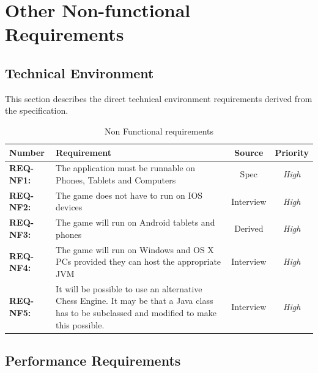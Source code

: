 \documentclass[a4paper,10pt]{article}
\begin{document}
\section{Other Non-functional Requirements}

\subsection{Technical Environment}
This section describes the direct technical environment requirements derived from the specification.



\begin{table}[H]
\caption{Non Functional  requirements}
\label{table:NFReqs}
\begin{tabular}{|| l | p{10.5cm}  |  c  | c ||} \hline  
\textbf{Number} & \textbf{Requirement} & \textbf{Source} & \textbf{Priority}\\ \hline
\textbf{REQ-NF1:}  & The application must be runnable on Phones, Tablets and Computers & Spec & \textit{ High} \\

\textbf{REQ-NF2:} 
&  The game does not have to run on IOS devices
& Interview  &  \textit{High}\\

\textbf{REQ-NF3:} 
&  The game will run on Android tablets and phones
& Derived  &  \textit{High}\\

\textbf{REQ-NF4:} 
&  The game will run on Windows and OS X PCs provided they can host the appropriate JVM
& Interview  &  \textit{High}\\


\textbf{REQ-NF5:} 
& It will be possible to use an alternative Chess Engine. It may be that a Java class has to be subclassed and modified to make this possible. 
& Interview  &  \textit{High}\\

\hline
\end{tabular}
\end{table}


\subsection{Performance Requirements}
\end{document}
